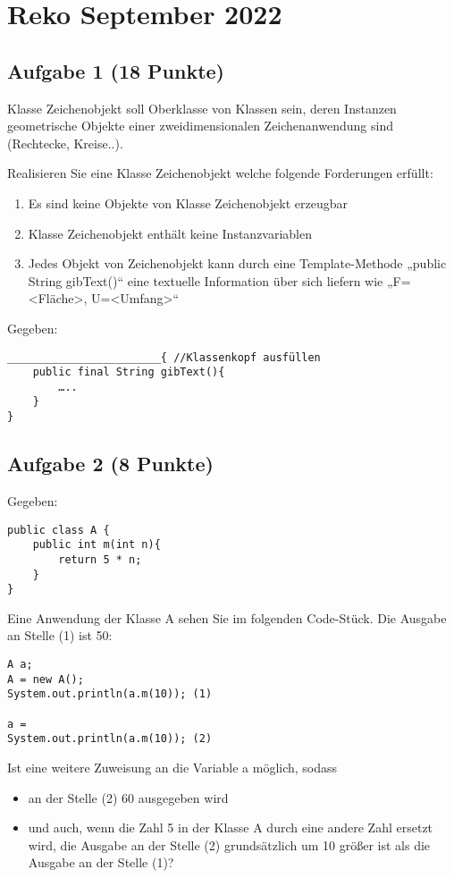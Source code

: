 \chapter{Reko September 2022}

\section{Aufgabe 1 (18 Punkte)}

Klasse Zeichenobjekt soll Oberklasse von Klassen sein, deren Instanzen
geometrische Objekte einer zweidimensionalen Zeichenanwendung sind (Rechtecke,
Kreise..).

Realisieren Sie eine Klasse Zeichenobjekt welche folgende Forderungen erfüllt:

\begin{enumerate}
    \item Es sind keine Objekte von Klasse Zeichenobjekt erzeugbar
    \item Klasse Zeichenobjekt enthält keine Instanzvariablen
    \item Jedes Objekt von Zeichenobjekt kann durch eine Template-Methode „public String
          gibText()“ eine textuelle Information über sich liefern wie „F=<Fläche>,
          U=<Umfang>“
\end{enumerate}

Gegeben:
\begin{lstlisting}
________________________{ //Klassenkopf ausfüllen
    public final String gibText(){
        …..
    }
}
\end{lstlisting}

\section{Aufgabe 2 (8 Punkte)}

Gegeben:

\begin{lstlisting}
public class A {
    public int m(int n){
        return 5 * n;
    }
}
\end{lstlisting}

Eine Anwendung der Klasse A sehen Sie im folgenden Code-Stück. Die Ausgabe an
Stelle (1) ist 50:

\begin{lstlisting}
A a;
A = new A();
System.out.println(a.m(10)); (1)

a =
System.out.println(a.m(10)); (2)
\end{lstlisting}

Ist eine weitere Zuweisung an die Variable a möglich, sodass
\begin{itemize}
    \item an der Stelle (2) 60 ausgegeben wird
    \item und auch, wenn die Zahl 5 in der Klasse A durch eine andere Zahl ersetzt wird,
          die Ausgabe an der Stelle (2) grundsätzlich um 10 größer ist als die Ausgabe an
          der Stelle (1)?
\end{itemize}

